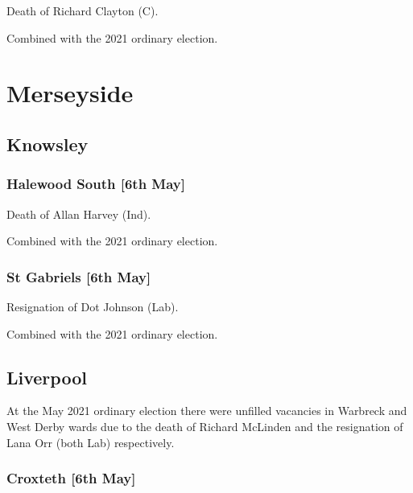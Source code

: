 \documentclass[a4paper,openany]{book}
\begin{document}
\begin{resultsiii}

Death of Richard Clayton (C).

Combined with the 2021 ordinary election.

\section{Merseyside}

\subsection*{Knowsley}

\subsubsection*{Halewood South \hspace*{\fill}\nolinebreak[1]%
	\enspace\hspace*{\fill}
	[6th May]}


Death of Allan Harvey (Ind).

Combined with the 2021 ordinary election.

\subsubsection*{St Gabriels \hspace*{\fill}\nolinebreak[1]%
	\enspace\hspace*{\fill}
	[6th May]}


Resignation of Dot Johnson (Lab).

Combined with the 2021 ordinary election.

\subsection*{Liverpool}

At the May 2021 ordinary election there were unfilled vacancies in Warbreck and West Derby wards due to the death of Richard McLinden and the resignation of Lana Orr (both Lab) respectively.

\subsubsection*{Croxteth \hspace*{\fill}\nolinebreak[1]%
	\enspace\hspace*{\fill}
	[6th May]}


\end{resultsiii}
\end{document}
